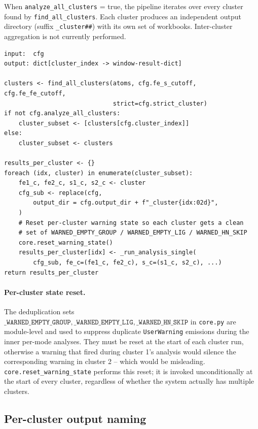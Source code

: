 \documentclass[10pt,a4paper,twoside]{article}
\newcommand{\codref}[1]{%
  \quad\text{\textcolor{gray!70!black}{\footnotesize $\rightsquigarrow$~\texttt{#1}}}}
\newcommand{\fn}[1]{\texttt{#1}}
\newcommand{\cfgkey}[1]{\texttt{#1}}
\begin{document}
\codref{runner.run\_analysis}

When \cfgkey{analyze\_all\_clusters} = true, the pipeline iterates
over every cluster found by \fn{find\_all\_clusters}. Each cluster
produces an independent output directory (suffix
\texttt{\_cluster\#\#}) with its own set of workbooks. Inter-cluster
aggregation is not currently performed.

\begin{lstlisting}[style=pseudo,
  caption={Multi-cluster dispatching. Implementation:
           \protect\fn{runner.run\_analysis}.}]
input:  cfg
output: dict[cluster_index -> window-result-dict]

clusters <- find_all_clusters(atoms, cfg.fe_s_cutoff, cfg.fe_fe_cutoff,
                              strict=cfg.strict_cluster)
if not cfg.analyze_all_clusters:
    cluster_subset <- [clusters[cfg.cluster_index]]
else:
    cluster_subset <- clusters

results_per_cluster <- {}
foreach (idx, cluster) in enumerate(cluster_subset):
    fe1_c, fe2_c, s1_c, s2_c <- cluster
    cfg_sub <- replace(cfg,
        output_dir = cfg.output_dir + f"_cluster{idx:02d}",
    )
    # Reset per-cluster warning state so each cluster gets a clean
    # set of WARNED_EMPTY_GROUP / WARNED_EMPTY_LIG / WARNED_HN_SKIP
    core.reset_warning_state()
    results_per_cluster[idx] <- _run_analysis_single(
        cfg_sub, fe_c=(fe1_c, fe2_c), s_c=(s1_c, s2_c), ...)
return results_per_cluster
\end{lstlisting}

\paragraph{Per-cluster state reset.}
The deduplication sets
$\fn{\_WARNED\_EMPTY\_GROUP}, \fn{\_WARNED\_EMPTY\_LIG}, \fn{\_WARNED\_HN\_SKIP}$
in \fn{core.py} are module-level and used to suppress duplicate
\fn{UserWarning} emissions during the inner per-mode analyses. They
must be reset at the start of each cluster run, otherwise a warning
that fired during cluster 1's analysis would silence the
corresponding warning in cluster 2 -- which would be misleading.
\fn{core.reset\_warning\_state} performs this reset; it is invoked
unconditionally at the start of every cluster, regardless of whether
the system actually has multiple clusters.

\subsection{Per-cluster output naming}
\end{document}
